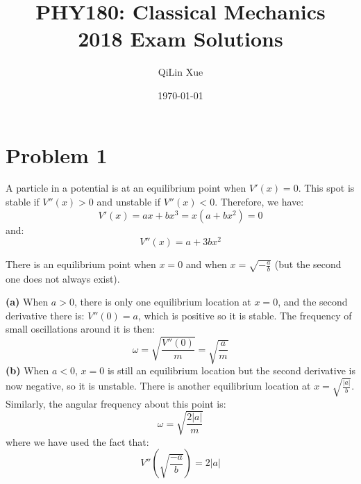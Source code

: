 \documentclass{article}
\title{PHY180: Classical Mechanics \\ 2018 Exam Solutions}
\author{QiLin Xue}
\date{\today}
\let\oldtextbf\textbf
\renewcommand{\textbf}[1]{\oldtextbf{#1}\index{#1}}
\begin{document}
\maketitle
\section*{Problem 1}
A particle in a potential is at an equilibrium point when $V'(x)=0$. This spot is stable if $V''(x)>0$ and unstable if $V''(x)<0$. Therefore, we have:
\begin{equation}
    V'(x) = ax+bx^3 = x(a+bx^2)=0
    \label{eq:}
\end{equation}
and:
\begin{equation}
    V''(x)=a+3bx^2
    \label{eq:}
\end{equation}

There is an equilibrium point when $x=0$ and when $x=\sqrt{-\frac{a}{b}}$ (but the second one does not always exist).

\textbf{(a)} When $a>0$, there is only one equilibrium location at $x=0$, and the second derivative there is: $V''(0)=a$, which is positive so it is stable. The frequency of small oscillations around it is then:
\begin{equation}
    \omega = \sqrt{\frac{V''(0)}{m}} = \sqrt{\frac{a}{m}}
    \label{eq:}
\end{equation}
\textbf{(b)} When $a<0$, $x=0$ is still an equilibrium location but the second derivative is now negative, so it is unstable. There is another equilibrium location at $x=\sqrt{\frac{|a|}{b}}$. Similarly, the angular frequency about this point is:
\begin{equation}
    \omega = \sqrt{\frac{2|a|}{m}}
    \label{eq:}
\end{equation}
where we have used the fact that:
\begin{equation}
    V''\left(\sqrt{\frac{-a}{b}}\right) = 2|a|
    \label{eq:}
\end{equation}
\end{document}
